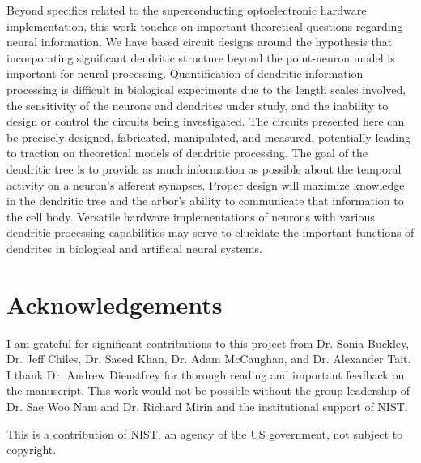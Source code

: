 \documentclass[twocolumn]{article}
\begin{document}
Beyond specifics related to the superconducting optoelectronic hardware implementation, this work touches on important theoretical questions regarding neural information. We have based circuit designs around the hypothesis that incorporating significant dendritic structure beyond the point-neuron model is important for neural processing. Quantification of dendritic information processing is difficult in biological experiments due to the length scales involved, the sensitivity of the neurons and dendrites under study, and the inability to design or control the circuits being investigated. The circuits presented here can be precisely designed, fabricated, manipulated, and measured, potentially leading to traction on theoretical models of dendritic processing. The goal of the dendritic tree is to provide as much information as possible about the temporal activity on a neuron's afferent synapses. Proper design will maximize knowledge in the dendritic tree and the arbor's ability to communicate that information to the cell body. Versatile hardware implementations of neurons with various dendritic processing capabilities may serve to elucidate the important functions of dendrites in biological and artificial neural systems.

\section{\label{sec:acknowledgements}Acknowledgements}
I am grateful for significant contributions to this project from Dr. Sonia Buckley, Dr. Jeff Chiles, Dr. Saeed Khan, Dr. Adam McCaughan, and Dr. Alexander Tait. I thank Dr. Andrew Dienstfrey for thorough reading and important feedback on the manuscript. This work would not be possible without the group leadership of Dr. Sae Woo Nam and Dr. Richard Mirin and the institutional support of NIST.

\vspace{1em}
This is a contribution of NIST, an agency of the US government, not subject to copyright.



\end{document}
